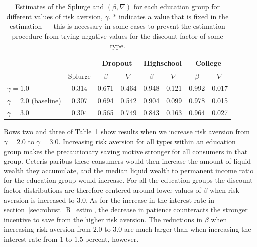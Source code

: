 \documentclass[../HAFiscal]{subfiles}
\begin{document}
\begin{table}[t]
\begin{center}
\begin{tabular}{lc|cccccc} 
	\toprule
	& & \multicolumn{2}{c}{Dropout} & \multicolumn{2}{c}{Highschool} & \multicolumn{2}{c}{College} \\ \midrule 
	& Splurge & $\beta$ & $\nabla$ & $\beta$ & $\nabla$ & $\beta$ & $\nabla$ \\ \midrule 
	$\gamma = 1.0$ & 0.314 & 0.671 & 0.464 & 0.948 & 0.121 & 0.992 & 0.017 \\ 
	$\gamma = 2.0$ (baseline) & 0.307 & 0.694 & 0.542 & 0.904 & 0.099 & 0.978 & 0.015 \\
	$\gamma = 3.0$ & 0.304 & 0.565 & 0.749 & 0.843 & 0.163 & 0.964 & 0.027 
	\\ \bottomrule 
\end{tabular}
\end{center}
\caption{Estimates of the Splurge and $(\beta,\nabla)$ for each education group for different values of risk aversion, $\gamma$. $*$ indicates a value that is fixed in the estimation --- this is necessary in some cases to prevent the estimation procedure from trying negative values for the discount factor of some type.}
\label{tab:robustness_gamma}
\end{table}

Rows two and three of Table~\ref{tab:robustness_gamma} show results when we increase risk aversion from $\gamma=2.0$ to $\gamma=3.0$. Increasing risk aversion for all types within an education group makes the precautionary saving motive stronger for all consumers in that group. Ceteris paribus these consumers would then increase the amount of liquid wealth they accumulate, and the median liquid wealth to permanent income ratio for the education group would increase. For all the education groups the discount factor distributions are therefore centered around lower values of $\beta$ when risk aversion is increased to $3.0$. As for the increase in the interest rate in section~\ref{sec:robust_R_estim}, the decrease in patience counteracts the stronger incentive to save from the higher risk aversion. The reductions in $\beta$ when increasing risk aversion from $2.0$ to $3.0$ are much larger than when increasing the interest rate from $1$ to $1.5$ percent, however. 
\end{document}
